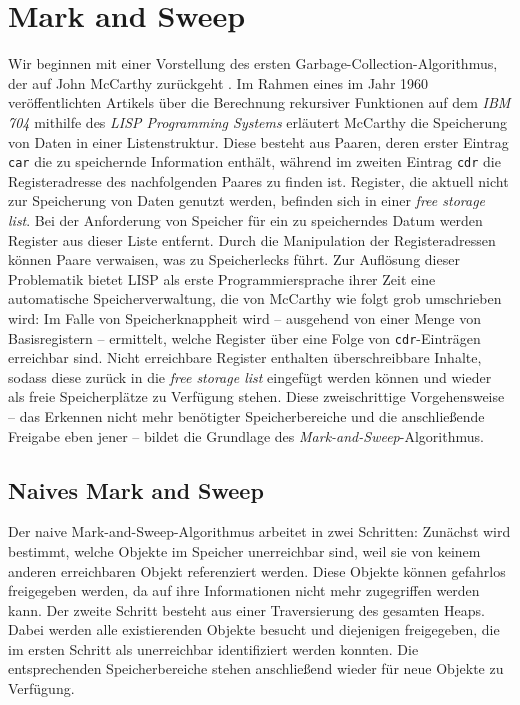 \chapter{Mark and Sweep}
\label{cha:mark-sweep}
Wir beginnen mit einer Vorstellung des ersten Garbage-Collection-Algorithmus, der auf John McCarthy zurückgeht \cite[191--193]{mccarthy1960}.
Im Rahmen eines im Jahr 1960 veröffentlichten Artikels über die Berechnung rekursiver Funktionen auf dem \textit{IBM 704} mithilfe des \textit{LISP Programming Systems} erläutert McCarthy die Speicherung von Daten in einer Listenstruktur.
Diese besteht aus Paaren, deren erster Eintrag \texttt{car} die zu speichernde Information enthält, während im zweiten Eintrag \texttt{cdr} die Registeradresse des nachfolgenden Paares zu finden ist.
Register, die aktuell nicht zur Speicherung von Daten genutzt werden, befinden sich in einer \textit{free storage list}.
Bei der Anforderung von Speicher für ein zu speicherndes Datum werden Register aus dieser Liste entfernt.
Durch die Manipulation der Registeradressen können Paare verwaisen, was zu Speicherlecks führt.
Zur Auflösung dieser Problematik bietet LISP als erste Programmiersprache ihrer Zeit eine automatische Speicherverwaltung, die von McCarthy wie folgt grob umschrieben wird:
Im Falle von Speicherknappheit wird -- ausgehend von einer Menge von Basisregistern -- ermittelt, welche Register über eine Folge von \texttt{cdr}-Einträgen erreichbar sind.
Nicht erreichbare Register enthalten überschreibbare Inhalte, sodass diese zurück in die \textit{free storage list} eingefügt werden können und wieder als freie Speicherplätze zu Verfügung stehen.
Diese zweischrittige Vorgehensweise -- das Erkennen nicht mehr benötigter Speicherbereiche und die anschließende Freigabe eben jener -- bildet die Grundlage des \textit{Mark-and-Sweep}-Algorithmus.

\section{Naives Mark and Sweep}
\label{sec:naive-mark-sweep}
Der naive Mark-and-Sweep-Algorithmus arbeitet in zwei Schritten:
Zunächst wird bestimmt, welche Objekte im Speicher unerreichbar sind, weil sie von keinem anderen erreichbaren Objekt referenziert werden.
Diese Objekte können gefahrlos freigegeben werden, da auf ihre Informationen nicht mehr zugegriffen werden kann.
Der zweite Schritt besteht aus einer Traversierung des gesamten Heaps.
Dabei werden alle existierenden Objekte besucht und diejenigen freigegeben, die im ersten Schritt als unerreichbar identifiziert werden konnten.
Die entsprechenden Speicherbereiche stehen anschließend wieder für neue Objekte zu Verfügung.

